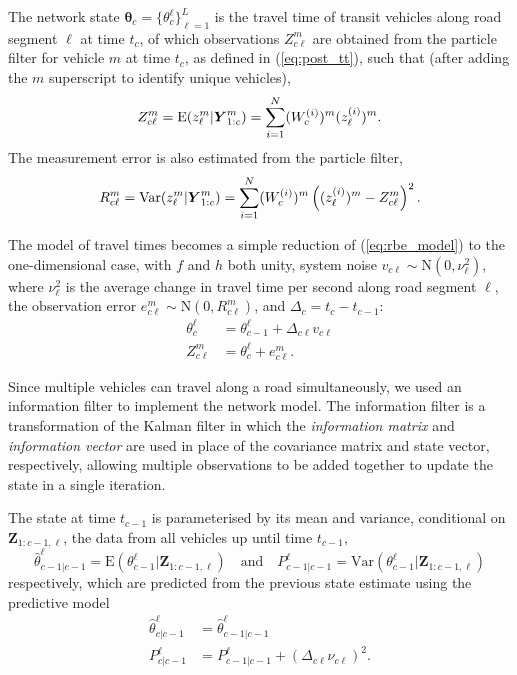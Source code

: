 The network state $\boldsymbol\theta_c = \{\theta_c^\ell\}_{\ell = 1}^L$ is the travel time 
of transit vehicles along road segment $\ell$ at time $t_c$,
of which observations $Z_{c\ell}^{m}$
are obtained from the particle filter for vehicle $m$ at time $t_c$,
as defined in (\ref{eq:post_tt}), such that 
(after adding the $m$ superscript to identify unique vehicles), 
\begin{equation}
\label{eq:tt_obs_mean}
Z_{c\ell}^{m} = \mathrm{E}(z_{\ell}^{m} | \mbox{$\boldsymbol{Y}$}^m_{1:c}) = 
\sum_{i=1}^N (W_c^{(i)})^m (z_\ell^{(i)})^{m}.
\end{equation}
The measurement error is also estimated from the particle filter,
\begin{equation}
\label{eq:tt_obs_err}
R_{c\ell}^m = \mathrm{Var}(z_{\ell}^{m} | \mbox{$\boldsymbol{Y}$}^m_{1:c}) = 
\sum_{i=1}^N (W_c^{(i)})^m \left((z_\ell^{(i)})^{m} - Z_{c\ell}^{m}\right)^2.
\end{equation}

The model of travel times becomes a simple reduction of (\ref{eq:rbe_model}) 
to the one-dimensional case, 
with $f$ and $h$ both unity,
system noise $v_{c\ell} \sim \mathrm{N}(0, \nu_\ell^2)$,
where $\nu_\ell^2$ is the average change in travel time per second
along road segment $\ell$,
the observation error $e_{c\ell}^{m} \sim \mathrm{N}(0, R_{c\ell}^{m})$,
and $\Delta_c = t_c - t_{c-1}$:
\begin{equation*}
\begin{split}
\theta_c^\ell &= \theta_{c-1}^\ell + \Delta_{c\ell} v_{c\ell} \\
Z_{c\ell}^{m} &= \theta_c^\ell + e_{c\ell}^{m}.
\end{split}
\end{equation*}


Since multiple vehicles can travel along a road simultaneously,
we used an information filter to implement the network model.
The information filter is a transformation of the Kalman filter in which the
\emph{information matrix} and \emph{information vector} are used in place of 
the covariance matrix and state vector, respectively,
allowing multiple observations to be added together to update the state
in a single iteration.


The state at time $t_{c-1}$ is parameterised by its mean and variance,
conditional on $\boldsymbol{Z}_{1:c-1,\ell}$, 
the data from all vehicles up until time $t_{c-1}$,
\begin{equation*}
\hat \theta_{c-1|c-1}^\ell = 
\mathrm{E}(\theta_{c-1}^\ell | \boldsymbol{Z}_{1:c-1,\ell})
\quad\text{and}\quad
P_{c-1|c-1}^\ell = 
\mathrm{Var}(\theta_{c-1}^\ell | \boldsymbol{Z}_{1:c-1,\ell})
\end{equation*}
respectively,
which are predicted from the previous state estimate using the predictive model
\begin{align*}
\label{eq:kf_transition}
\hat \theta^\ell_{c|c-1} &= \hat \theta^\ell_{c-1|c-1} \\
P^\ell_{c|c-1} &= P^\ell_{c-1|c-1} + (\Delta_{c\ell} \nu_{c\ell})^2.
\end{align*}

